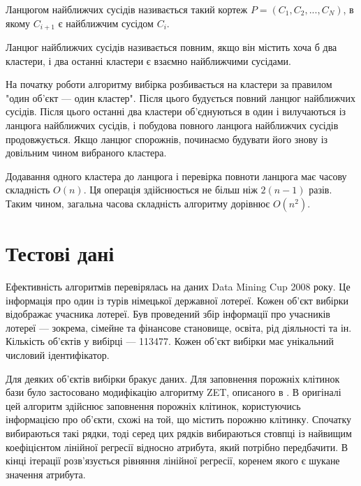             \begin{definition}
                Ланцюгом найближчих сусідів називається такий кортеж $P = (C_1, C_2, ..., C_N)$, в якому $C_{i+1}$ є найближчим сусідом $C_i$.
            \end{definition}
            
            \begin{definition}
                Ланцюг найближчих сусідів називається повним, якщо він містить хоча б два кластери, і два останні кластери є взаємно найближчими сусідами.
            \end{definition}
            
            На початку роботи алгоритму вибірка розбивається на кластери за правилом "один об'єкт --- один кластер". Після цього будується повний ланцюг найближчих сусідів. Після цього останні два кластери об'єднуються в один і вилучаються із ланцюга найближчих сусідів, і побудова повного ланцюга найближчих сусідів продовжується. Якщо ланцюг спорожнів, починаємо будувати його знову із довільним чином вибраного кластера.
            
            Додавання одного кластера до ланцюга і перевірка повноти ланцюга має часову складність $O(n)$. Ця операція здійснюється не більш ніж $2(n-1)$ разів. Таким чином, загальна часова складність алгоритму дорівнює $O(n^2)$. 
            
    \section {Тестові дані}
        Ефективність алгоритмів перевірялась на даних Data Mining Cup 2008 року. Це інформація про один із турів німецької державної лотереї. Кожен об'єкт вибірки відображає учасника лотереї. Був проведений збір інформації про учасників лотереї --- зокрема, сімейне та фінансове становище, освіта, рід діяльності та ін. Кількість об'єктів у вибірці --- 113477. Кожен об'єкт вибірки має унікальний числовий ідентифікатор.
        
        Для деяких об'єктів вибірки бракує даних. Для заповнення порожніх клітинок бази було застосовано модифікацію алгоритму ZET, описаного в \cite{Zagorujko}. В оригіналі цей алгоритм здійснює заповнення порожніх клітинок, користуючись інформацією про об'єкти, схожі на той, що містить порожню клітинку. Спочатку вибираються такі рядки, тоді серед цих рядків вибираються стовпці із найвищим коефіцієнтом лінійної регресії відносно атрибута, який потрібно передбачити. В кінці ітерації розв'язується рівняння лінійної регресії, коренем якого є шукане значення атрибута.
        
